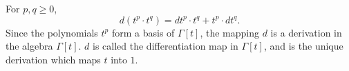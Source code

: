 For $p, q \geq 0$,
$$d(t^p \cdot t^q) = dt^p \cdot t^q + t^p \cdot dt^q.$$
Since the polynomials $t^p$ form a basis of $\Gamma[t]$, the mapping $d$ is a derivation in the algebra $\Gamma[t]$. $d$ is called the differentiation map in $\Gamma[t]$, and is the unique derivation which maps $t$ into $1$.

